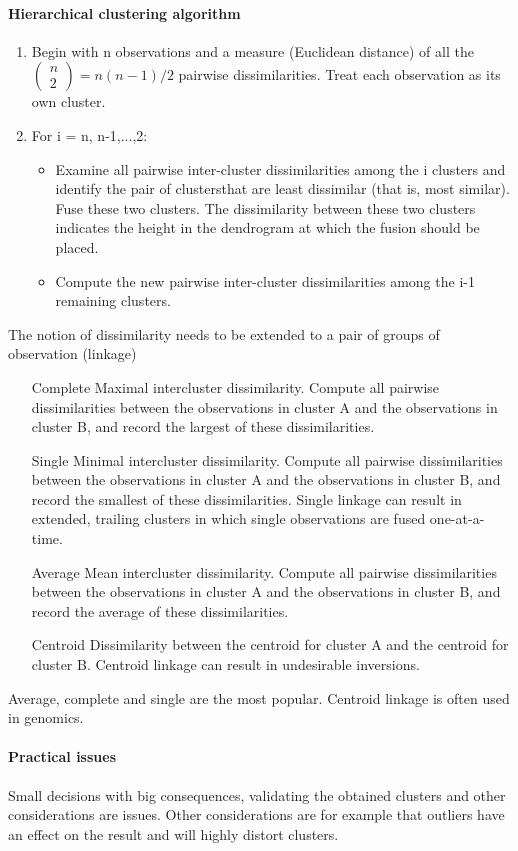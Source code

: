 \documentclass[../document.tex]{subfiles}
\begin{document}
	\paragraph{Hierarchical clustering algorithm}
	\begin{enumerate}
		\item Begin with n observations and a measure (Euclidean distance) of all the 
		\(
		\begin{pmatrix}
			n\\2
		\end{pmatrix} = n(n-1)/2
		\)
		 pairwise dissimilarities. Treat each observation as its own cluster.
		\item For i = n, n-1,...,2:
		\begin{itemize}
			\item Examine all pairwise inter-cluster dissimilarities among the i clusters and identify the pair of clustersthat are least dissimilar (that is, most similar). Fuse these two clusters. The dissimilarity between these two clusters indicates the height in the dendrogram at which the fusion should be placed.
			\item Compute the new pairwise inter-cluster dissimilarities among the i-1 remaining clusters.
		\end{itemize}
	\end{enumerate}
	The notion of dissimilarity needs to be extended to a pair of groups of observation (linkage)
	\begin{itemize}
		\item [Complete] Maximal intercluster dissimilarity. Compute all pairwise dissimilarities between the observations in cluster A and the observations in cluster B, and record the largest of these dissimilarities.
		\item [Single] Minimal intercluster dissimilarity. Compute all pairwise dissimilarities between the observations in cluster A and the observations in cluster B, and record the smallest of these dissimilarities. Single linkage can result in extended, trailing clusters in which single observations are fused one-at-a-time.
		\item [Average] Mean intercluster dissimilarity. Compute all pairwise dissimilarities between the observations in cluster A and the observations in cluster B, and record the average of these dissimilarities.
		\item [Centroid] Dissimilarity between the centroid for cluster A and the centroid for cluster B. Centroid linkage can result in undesirable inversions. 
	\end{itemize}
	Average, complete and single are the most popular. Centroid linkage is often used in genomics.
	\paragraph{Practical issues}
	Small decisions with big consequences, validating the obtained clusters and other considerations are issues. Other considerations are for example that outliers have an effect on the result and will highly distort clusters.
	
\end{document}
